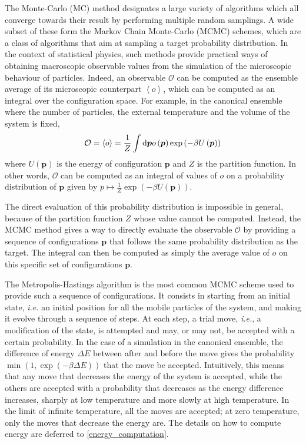 \documentclass[main.tex]{subfiles}
\begin{document}
The Monte-Carlo (MC) method designates a large variety of algorithms which all converge towards their result by performing multiple random samplings. A wide subset of these form the Markov Chain Monte-Carlo (MCMC) schemes, which are a class of algorithms that aim at sampling a target probability distribution. In the context of statistical physics, such methods provide practical ways of obtaining macroscopic observable values from the simulation of the microscopic behaviour of particles. Indeed, an observable $\mathcal O$ can be computed as the ensemble average of its microscopic counterpart $\left<o\right>$, which can be computed as an integral over the configuration space. For example, in the canonical ensemble where the number of particles, the external temperature and the volume of the system is fixed, \[\mathcal O = \left<o\right> = \frac1Z\int\text d{\boldsymbol p} o\left({\boldsymbol p}\right)\exp\left(-\beta U\left({\boldsymbol p}\right)\right)\] where $ U\left({\boldsymbol p}\right)$ is the energy of configuration $\boldsymbol p$ and $Z$ is the partition function. In other words, $\mathcal O$ can be computed as an integral of values of $o$ on a probability distribution of $\boldsymbol p$ given by $p\mapsto \frac1Z\exp\left(-\beta U\left({\boldsymbol p}\right)\right)$.

The direct evaluation of this probability distribution is impossible in general, because of the partition function $Z$ whose value cannot be computed. Instead, the MCMC method gives a way to directly evaluate the observable $\mathcal O$ by providing a sequence of configurations $\boldsymbol p$ that follows the same probability distribution as the target. The integral can then be computed as simply the average value of $o$ on this specific set of configurations $\boldsymbol p$.

\label{metropolis}

The Metropolis-Hastings algorithm is the most common MCMC scheme used to provide such a sequence of configurations. It consists in starting from an initial state, \textit{i.e.} an initial position for all the mobile particles of the system, and making it evolve through a sequence of steps. At each step, a trial move, \textit{i.e.}, a modification of the state, is attempted and may, or may not, be accepted with a certain probability. In the case of a simulation in the canonical ensemble, the difference of energy $\Delta E$ between after and before the move gives the probability $\min\left(1, \exp\left(-\beta \Delta E\right)\right)$ that the move be accepted. Intuitively, this means that any move that decreases the energy of the system is accepted, while the others are accepted with a probability that decreases as the energy difference increases, sharply at low temperature and more slowly at high temperature. In the limit of infinite temperature, all the moves are accepted; at zero temperature, only the moves that decrease the energy are. The details on how to compute energy are deferred to \cref{energy_computation}.
\end{document}
